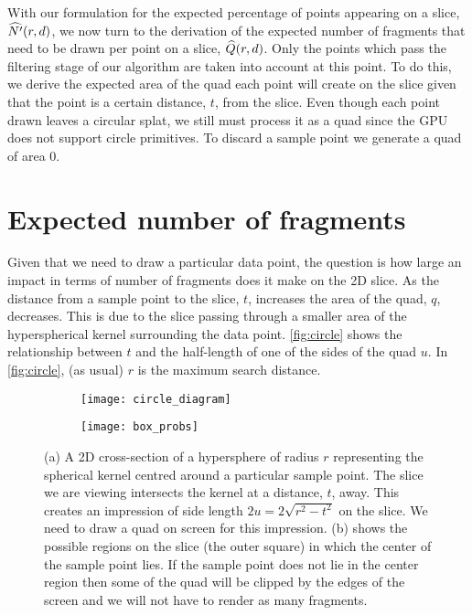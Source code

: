 

With our formulation for the expected percentage of points appearing on a
slice, $\widehat{N'}(r, d)$, we now turn to the derivation of the expected
number of fragments that need to be drawn per point on a slice, 
$\widehat{Q}(r,d)$. Only the points which pass the filtering stage of our algorithm
are taken into account at this point. 
To do this,
we derive the expected area of 
the quad each point will create on the slice given that the point is a certain
distance, $t$, from the slice. Even though each point drawn
leaves a circular splat, we still must process it as a quad since the GPU
does not support circle primitives. To discard a sample point we generate a
quad of area $0$.

\section{Expected number of fragments}

Given that we need to draw a particular data point, the question is how large
an impact in terms of number of fragments does it make on the 2D slice. As the
distance from a sample point to the slice, $t$, increases the area of the 
quad, $q$, decreases. This is due to the slice passing through a smaller area 
of the
hyperspherical kernel surrounding the data point. \autoref{fig:circle} shows the
relationship between $t$ and the half-length of one of the sides of the 
quad $u$.  In \autoref{fig:circle}, (as usual) $r$ is the maximum search distance.

\begin{figure}[htb]
\centering
\begin{subfigure}{0.4\textwidth}
  \texttt{[image: circle\_diagram]}
  \caption{
  }
  \label{fig:circle}
\end{subfigure}%
\begin{subfigure}{0.4\textwidth}
  \texttt{[image: box\_probs]}
  \caption{
  }
  \label{fig:quad_size}
\end{subfigure}
\caption[Kernel/slice interaction]{%
  (a) A 2D cross-section of a hypersphere of radius $r$ representing 
  the spherical kernel 
  centred around a particular sample point.  The slice we are
  viewing intersects the kernel at a distance, $t$, away.  This 
  creates an impression of side length $2u = 2\sqrt{r^2-t^2}$ on the 
  slice.  We need to draw a quad on screen for this impression.
  (b) shows the possible regions on the slice (the outer square)
  in which the center of the sample point lies.  If the sample point
  does not lie in the center region then some of the quad will be clipped
  by the edges of the screen and we will not have to render as many 
  fragments.
}
\label{fig:appendix_geom}
\end{figure}

